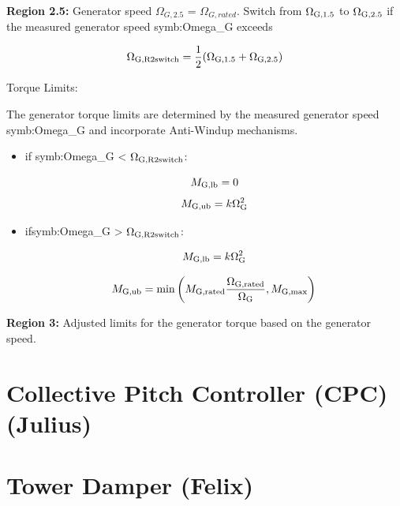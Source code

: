 \textbf{Region 2.5:} Generator speed $\Omega_{G,2.5}$ = $\Omega_{G,rated}$.
Switch from $\Omega_{\textnormal{G,1.5}}$ to $\Omega_{\textnormal{G,2.5}}$ if the measured generator speed \gls{symb:Omega_G} exceeds 

\begin{equation}
	\Omega_{\textnormal{G,R2switch}} = \frac{1}{2} (\Omega_{\textnormal{G,1.5}} + \Omega_{\textnormal{G,2.5}})
	\label{equation:Omega_Region_2.5}
\end{equation}

Torque Limits: 

The generator torque limits are determined by the measured generator speed \gls{symb:Omega_G} and incorporate Anti-Windup mechanisms.

\begin{itemize}
	
	\item if \gls{symb:Omega_G} < $\Omega_{\textnormal{G,R2switch}}$:
	
	\begin{equation}
		M_{\textnormal{G,lb}} = 0
		\label{equation:MG,lb}
	\end{equation}
	\begin{equation}
		M_{\textnormal{G,ub}} = k \Omega_{\textnormal{G}}^2
		\label{equation:MG,ub}
	\end{equation}
	
	\item if\gls{symb:Omega_G} > $\Omega_{\textnormal{G,R2switch}}$:
	
	\begin{equation}
		M_{\textnormal{G,lb}} = k \Omega_{\textnormal{G}}^2
		\label{equation:MG,lb,2}
	\end{equation}
	
	\begin{equation} 
		M_{\textnormal{G,ub}} = \min\left(M_{\textnormal{G,{rated}}}\frac{\Omega_{\textnormal{G,{rated}}}}{\Omega_{\textnormal{G}}}, M_{\textnormal{G,max}}\right)
		\label{equation:MG,ub,2}
	\end{equation}
	
\end{itemize}

\textbf{Region 3:} Adjusted limits for the generator torque based on the generator speed.

\section{Collective Pitch Controller (CPC) (Julius)}


\section{Tower Damper (Felix)}

